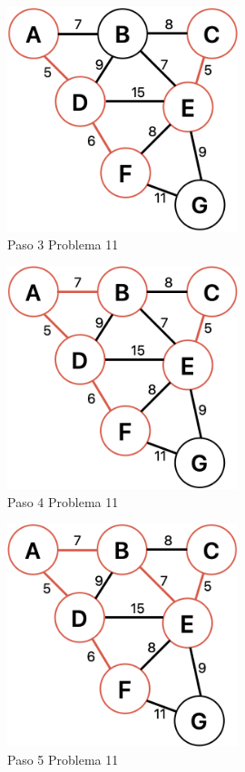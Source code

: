 \documentclass[12pt]{article}  %
\begin{document}
\begin{figure}[H]
\centering
\caption{Paso 3 Problema 11}
\label{fig:paso3Prob11}
\includegraphics[width=0.6\textwidth]{assets/paso3Prob11.png}
\end{figure}

\begin{figure}[H]
\centering
\caption{Paso 4 Problema 11}
\label{fig:paso4Prob11}
\includegraphics[width=0.6\textwidth]{assets/paso4Prob11.png}
\end{figure}

\begin{figure}[H]
\centering
\caption{Paso 5 Problema 11}
\label{fig:paso5Prob11}
\includegraphics[width=0.6\textwidth]{assets/paso5Prob11.png}
\end{figure}
\end{document}
